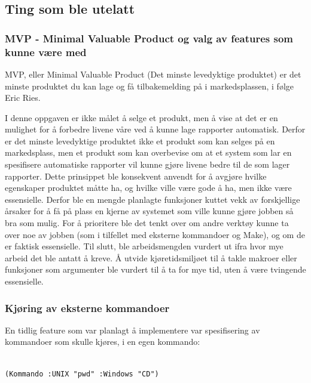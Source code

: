 \documentclass[norsk, 11pt, a4paper]{article}
\begin{document}
\subsection{Ting som ble utelatt}



\subsubsection{MVP - Minimal Valuable Product og valg av features som kunne være med}



MVP, eller Minimal Valuable Product (Det minste levedyktige produktet) er det minste produktet du kan lage og få tilbakemelding på i markedsplassen, i følge Eric Ries.



I denne oppgaven er ikke målet å selge et produkt, men å vise at det er en mulighet for å forbedre livene våre ved å kunne lage rapporter automatisk. Derfor er det minste levedyktige produktet ikke et produkt som kan selges på en markedsplass,
men et produkt som kan overbevise om at et system som lar en spesifisere automatiske rapporter vil kunne gjøre livene bedre til de som lager rapporter. Dette prinsippet ble konsekvent anvendt for å avgjøre hvilke egenskaper produktet måtte ha, og hvilke ville være gode å ha, men ikke være essensielle.
Derfor ble en mengde planlagte funksjoner kuttet vekk av forskjellige årsaker for å få på plass en kjerne av systemet som ville kunne gjøre jobben så bra som mulig. For å prioritere ble det tenkt over om andre verktøy kunne ta over noe av jobben (som i tilfellet med eksterne kommandoer og Make), og om de er faktisk essensielle. Til slutt, ble arbeidsmengden vurdert ut ifra hvor mye arbeid det ble antatt å kreve. Å utvide kjøretidsmiljøet til å takle makroer eller funksjoner som argumenter ble vurdert til å ta for mye tid, uten å være tvingende essensielle.



\subsubsection{Kjøring av eksterne kommandoer}



En tidlig feature som var planlagt å implementere var spesifisering av kommandoer som skulle kjøres, i en egen kommando:




\begin{lstlisting}

(Kommando :UNIX "pwd" :Windows "CD")
\end{lstlisting}
\end{document}
